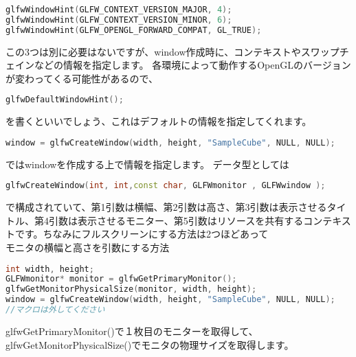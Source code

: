 \documentclass[a4paper,titlepage]{jsarticle}
\begin{document}
\begin{lstlisting}[language=C++]
glfwWindowHint(GLFW_CONTEXT_VERSION_MAJOR, 4);
glfwWindowHint(GLFW_CONTEXT_VERSION_MINOR, 6);
glfwWindowHint(GLFW_OPENGL_FORWARD_COMPAT, GL_TRUE);
\end{lstlisting}
この3つは別に必要はないですが、window作成時に、コンテキストやスワップチェインなどの情報を指定します。
各環境によって動作するOpenGLのバージョンが変わってくる可能性があるので、
\begin{lstlisting}[language=C++]
glfwDefaultWindowHint();
\end{lstlisting}
を書くといいでしょう、これはデフォルトの情報を指定してくれます。
\begin{lstlisting}[language=C++]
window = glfwCreateWindow(width, height, "SampleCube", NULL, NULL);
\end{lstlisting}
ではwindowを作成する上で情報を指定します。
データ型としては
\begin{lstlisting}[language=C++]
glfwCreateWindow(int, int,const char, GLFWmonitor , GLFWwindow );
\end{lstlisting}
で構成されていて、第1引数は横幅、第2引数は高さ、第3引数は表示させるタイトル、第4引数は表示させるモニター、第5引数はリソースを共有するコンテキストです。ちなみにフルスクリーンにする方法は2つほどあって\\モニタの横幅と高さを引数にする方法
\begin{lstlisting}[language=C++]
int width, height;
GLFWmonitor* monitor = glfwGetPrimaryMonitor();
glfwGetMonitorPhysicalSize(monitor, width, height);
window = glfwCreateWindow(width, height, "SampleCube", NULL, NULL);
//マクロは外してください
\end{lstlisting}
glfwGetPrimaryMonitor()で１枚目のモニターを取得して、glfwGetMonitorPhysicalSize()でモニタの物理サイズを取得します。
\end{document}
